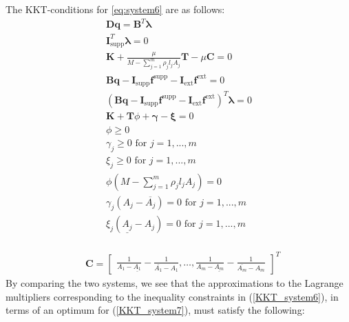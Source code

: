 
The KKT-conditions for \eqref{eq:system6} are as follows:
\begin{equation}
\label{KKT_system7}
\begin{aligned}
\bm{Dq} = \bm{B}^{T}\bm{\lambda}\\
\bm{I}^{T}_{\textrm{supp}}\bm{\lambda} = 0 \\
\bm{K} + \frac{\mu}{M-\sum\limits_{j=1}^m\rho_{j}l_{j}A_{j}}\bm{T} - \mu\bm{C} = 0 \\
\bm{Bq} - \bm{I}_{\textrm{supp}}\bm{f}^{\textrm{supp}} - \bm{I}_{\textrm{ext}}\bm{f}^{\textrm{ext}} = 0 \\
(\bm{Bq} - \bm{I}_{\textrm{supp}}\bm{f}^{\textrm{supp}} - \bm{I}_{\textrm{ext}}\bm{f}^{\textrm{ext}})^T\bm{\lambda} = 0 \\
\bm{K} + \bm{T}\phi + \bm{\gamma} - \bm{\xi} = 0 \\
\phi \geq 0  \\
\gamma_j \geq 0 \text{ for } j = 1,...,m \\
\xi_j \geq 0 \text{ for } j = 1,...,m \\
\phi(M-\sum\limits_{j=1}^m\rho_{j}l_{j}A_{j}) = 0 \\
\gamma_{j}(A_{j}-\overline{A_{j}}) = 0 \text{ for } j = 1,...,m \\
\xi_{j}(\underline{A_{j}}-A_{j}) = 0 \text{ for } j = 1,...,m \\
\end{aligned}
\end{equation}

\begin{align*}
&\bm{C} = \begin{bmatrix}
\frac{1}{A_1-\underline{A_{1}}} - \frac{1}{\overline{A_{1}}-A_{1}}, \hdots, \frac{1}{A_m-\underline{A_{m}}} - \frac{1}{\overline{A_{m}}-A_{m}}
\end{bmatrix}^T
\end{align*}
By comparing the two systems, we see that the approximations to the Lagrange multipliers corresponding to the inequality constraints in (\ref{KKT_system6}), in terms of an optimum for (\ref{KKT_system7}), must satisfy the following:

